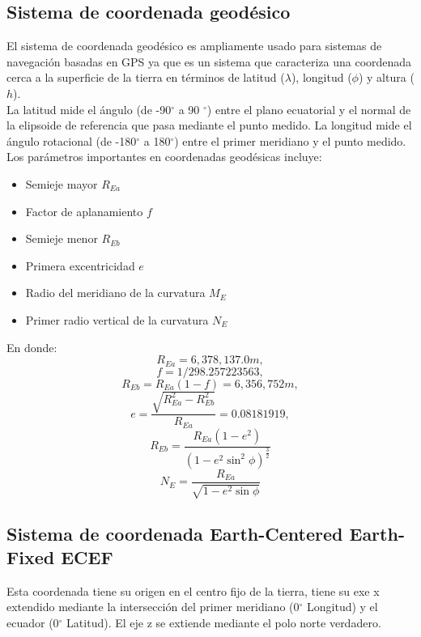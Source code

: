 \documentclass[]{report}
\begin{document}
\subsection{Sistema de coordenada geodésico}
El sistema de coordenada geodésico es ampliamente usado para sistemas de navegación basadas en GPS ya que es un sistema que caracteriza una coordenada cerca a la superficie de la tierra en términos de latitud ($\lambda$), longitud ($\phi$) y altura ($h$).\\
La latitud mide el ángulo (de -90$^{\circ}$ a 90 $^{\circ}$) entre el plano ecuatorial y el normal  de la elipsoide de referencia que pasa mediante el punto medido. La longitud mide el ángulo rotacional (de -180$^{\circ}$ a 180$^{\circ}$) entre el primer meridiano y el punto medido.\\
Los parámetros importantes en coordenadas geodésicas incluye:
\begin{itemize}
	\item Semieje mayor $R_{Ea}$
	\item Factor de aplanamiento $f$
	\item Semieje menor $R_{Eb}$
	\item Primera excentricidad $e$
	\item Radio del meridiano de la curvatura $M_{E}$
	\item Primer radio vertical de la curvatura $N_{E}$
\end{itemize}
En donde:
\begin{equation}
	R_{Ea} = 6,378,137.0 m,
\end{equation}
\begin{equation}
	f = 1/298.257223563,
\end{equation}
\begin{equation}
R_{Eb} = R_{Ea} (1-f)  = 6,356,752 m,
\end{equation}
\begin{equation}
e = \frac{\sqrt{R_{Ea}^{2}-R_{Eb}^{2}}}{R_{Ea}}= 0.08181919, \label{4:1}
\end{equation}
\begin{equation}
R_{Eb} = \frac{R_{Ea}(1-e^{2})}{(1-e^{2}\sin^{2}\phi)^{\frac{3}{2}}}
\end{equation}
\begin{equation}
N_{E}=\frac{R_{Ea}}{\sqrt{1-e^{2}\sin\phi}} \label{4:6}
\end{equation}

\subsection{Sistema de coordenada Earth-Centered Earth-Fixed ECEF}
Esta coordenada tiene su origen en el centro fijo de la tierra, tiene su exe x extendido mediante la intersección del primer meridiano (0$^{\circ}$ Longitud) y el ecuador (0$^{\circ}$ Latitud). El eje z se extiende mediante el polo norte verdadero.
\end{document}

